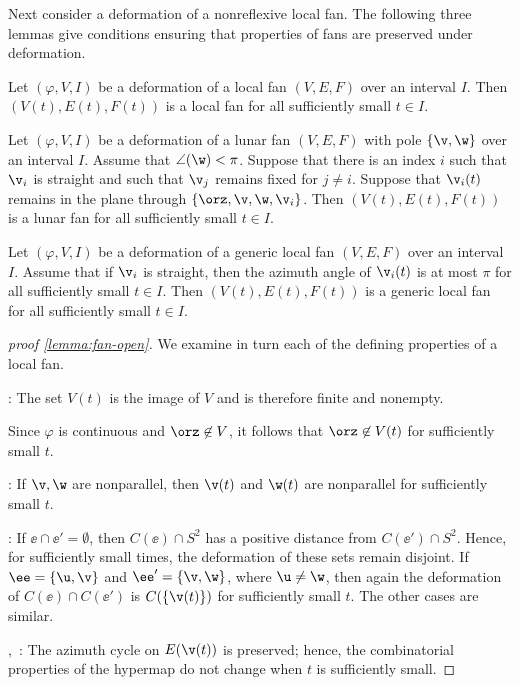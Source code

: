 Next consider a deformation of a nonreflexive local fan.  The following 
three lemmas give conditions ensuring that  properties of fans are
preserved under deformation.


\begin{lemma}\label{lemma:fan-open}
  Let $(\varphi,V,I)$ be a deformation of a  local fan
  $(V,E,F)$ over an interval $I$. 
Then $(V(t),E(t),F(t))$ is a
local fan for all sufficiently small $t\in I$.
\end{lemma}

\begin{lemma}\label{lemma:fan-open-lunar}
  Let $(\varphi,V,I)$ be a deformation of a lunar fan $(V,E,F)$ with pole $\{\v,\w\}$
  over
  an interval $I$.  Assume that $\angle(\w)<\pi$.
  Suppose that there is an index $i$ such that
  $\v_i$ is straight and such that $\v_j$ remains fixed for $j\ne i$.
  Suppose that $\v_i(t)$ remains in the plane through
  $\{\orz,\v,\w,\v_i\}$.  Then $(V(t),E(t),F(t))$
 is a lunar fan for
  all sufficiently small $t\in I$.
\end{lemma}

\begin{lemma}\label{lemma:fan-open-generic}
Let $(\varphi,V,I)$ be a deformation of a generic local fan
  $(V,E,F)$ over an interval $I$.  
Assume that if $\v_i$ is straight, then the azimuth angle of $\v_i(t)$ is at most
$\pi$ for all sufficiently small $t\in I$.  Then 
 $(V(t),E(t),F(t))$ is a
generic local fan for all sufficiently small $t\in I$.
\end{lemma}

\begin{proof}[proof \eqref{lemma:fan-open}] 
We examine in turn each of the defining properties of a local fan.

: The set $V(t)$ is the image of $V$ and is
therefore finite and nonempty.

 Since $\varphi$ is continuous and
$\orz\not\in V$, it follows that $\orz\not\in V(t)$ for sufficiently
small $t$.

: If $\v,\w$ are nonparallel, then $\v(t)$ and
$\w(t)$ are nonparallel for sufficiently small $t$.

: If $\ee \cap \ee'=\emptyset$, then $C(\ee)\cap
S^2$ has a positive distance from $C(\ee')\cap S^2$.  Hence, for
sufficiently small times, the deformation of these sets remain
disjoint.  If $\ee=\{\u,\v\}$ and $\ee'=\{\v,\w\}$, where $\u\ne\w$,
then again the deformation of $C(\ee)\cap C(\ee')$ is
$C(\{\v(t)\})$ for sufficiently small $t$.  The other cases are
similar.

,~: The azimuth cycle on $E(\v(t))$
is preserved; hence, the combinatorial properties of the hypermap do
not change when $t$ is sufficiently small.
\end{proof}

